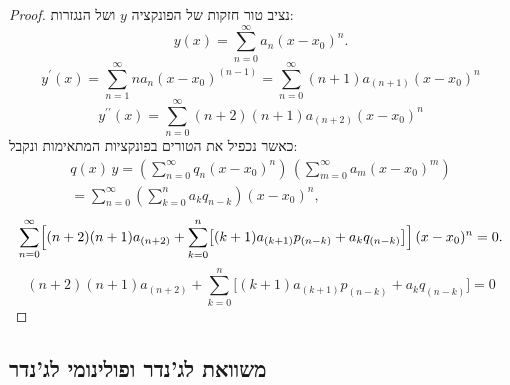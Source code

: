 \documentclass{tstextbook}
\begin{document}
\begin{proof}
נציב טור חזקות של הפונקציה \(y\) ושל הנגזרות:
$$y(x)=\sum_{n=0}^{\infty}a_{n}\left(x-x_{0}\right)^{n}.$$$$y^{\prime}(x)=\sum_{n=1}^{\infty}n a_{n}\left(x-x_{0}\right)^{(n-1)}=\sum_{n=0}^{\infty}(n+1)a_{(n+1)}\left(x-x_{0}\right)^{n}$$$$y^{\prime\prime}(x)=\sum_{n=0}^{\infty}(n+2)(n+1)a_{(n+2)}\left(x-x_{0}\right)^{n}$$
כאשר נכפיל את הטורים בפונקציות המתאימות ונקבל:
$$\begin{array}{c}{{q(x)\,y=\left(\sum_{n=0}^{\infty}q_{n}(x-x_{0})^{n}\right)\,\left(\sum_{m=0}^{\infty}a_{m}(x-x_{0})^{m}\right)}}\\ {{=\sum_{n=0}^{\infty}\left(\sum_{k=0}^{n}a_{k}q_{n-k}\right)(x-x_{0})^{n},}}\end{array}$$$$\sum_{n=0}^{\infty}\Bigl[(n+2)(n+1)a_{(n+2)}+\sum_{k=0}^{n}\bigl[(k+1)a_{(k+1)}p_{(n-k)}+a_{k}q_{(n-k)}\bigr]\Bigr]\,(x-x_{0})^{n}=0.$$$$(n+2)(n+1)a_{(n+2)}+\sum_{k=0}^{n}\bigl[(k+1)a_{(k+1)}p_{(n-k)}+a_{k}q_{(n-k)}\bigr]=0$$

\end{proof}
\subsection{משוואת לג'נדר ופולינומי לג'נדר}
\end{document}
